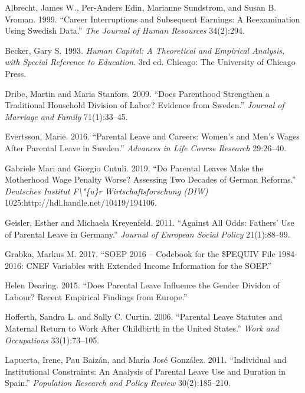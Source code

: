 \documentclass[
  11pt,
]{article}
\begin{document}
\hypertarget{refs}{}
\leavevmode\hypertarget{ref-albrecht_career_1999}{}%
Albrecht, James W., Per-Anders Edin, Marianne Sundstrom, and Susan B. Vroman. 1999. ``Career Interruptions and Subsequent Earnings: A Reexamination Using Swedish Data.'' \emph{The Journal of Human Resources} 34(2):294.

\leavevmode\hypertarget{ref-becker_human_1993}{}%
Becker, Gary S. 1993. \emph{Human Capital: A Theoretical and Empirical Analysis, with Special Reference to Education}. 3rd ed. Chicago: The University of Chicago Press.

\leavevmode\hypertarget{ref-dribe_does_2009}{}%
Dribe, Martin and Maria Stanfors. 2009. ``Does Parenthood Strengthen a Traditional Household Division of Labor? Evidence from Sweden.'' \emph{Journal of Marriage and Family} 71(1):33--45.

\leavevmode\hypertarget{ref-evertsson_parental_2016}{}%
Evertsson, Marie. 2016. ``Parental Leave and Careers: Women's and Men's Wages After Parental Leave in Sweden.'' \emph{Advances in Life Course Research} 29:26--40.

\leavevmode\hypertarget{ref-gabriele_mari_parental_2019}{}%
Gabriele Mari and Giorgio Cutuli. 2019. ``Do Parental Leaves Make the Motherhood Wage Penalty Worse? Assessing Two Decades of German Reforms.'' \emph{Deutsches Institut F\textbackslash"\{u\}r Wirtschaftsforschung (DIW)} 1025:http://hdl.handle.net/10419/194106.

\leavevmode\hypertarget{ref-geisler_against_2011}{}%
Geisler, Esther and Michaela Kreyenfeld. 2011. ``Against All Odds: Fathers' Use of Parental Leave in Germany.'' \emph{Journal of European Social Policy} 21(1):88--99.

\leavevmode\hypertarget{ref-grabka_soep_2017}{}%
Grabka, Markus M. 2017. ``SOEP 2016 -- Codebook for the \$PEQUIV File 1984-2016: CNEF Variables with Extended Income Information for the SOEP.''

\leavevmode\hypertarget{ref-helen_dearing_does_2015}{}%
Helen Dearing. 2015. ``Does Parental Leave Influence the Gender Dividon of Labour? Recent Empirical Findings from Europe.''

\leavevmode\hypertarget{ref-hofferth_parental_2006}{}%
Hofferth, Sandra L. and Sally C. Curtin. 2006. ``Parental Leave Statutes and Maternal Return to Work After Childbirth in the United States.'' \emph{Work and Occupations} 33(1):73--105.

\leavevmode\hypertarget{ref-lapuerta_individual_2011}{}%
Lapuerta, Irene, Pau Baizán, and María José González. 2011. ``Individual and Institutional Constraints: An Analysis of Parental Leave Use and Duration in Spain.'' \emph{Population Research and Policy Review} 30(2):185--210.
\end{document}
